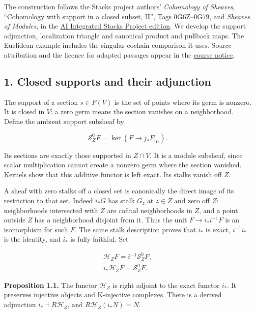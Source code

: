 \documentclass[
  english,
  11pt,
  a4paper,
]{article}
\begin{document}
The construction follows the Stacks project authors' \emph{Cohomology of
Sheaves}, ``Cohomology with support in a closed subset, II'', Tags
0G6Z--0G79, and \emph{Sheaves of Modules}, in the
\href{https://github.com/KokunoYumeto/unofficial-stacks-project-ai-drafts/tree/565b10e987aba5969b21145a0833f42d69f96790}{AI
Integrated Stacks Project edition}. We develop the support adjunction,
localization triangle and canonical product and pullback maps. The
Euclidean example includes the singular-cochain comparison it uses.
Source attribution and the licence for adapted passages appear in the
\hyperref[sources-and-authorship]{course notice}.

\subsection{1. Closed supports and their
adjunction}\label{sections-with-support-and-the-localization-triangle--1-closed-supports-and-their-adjunction}

The support of a section \(s\in F(V)\) is the set of points where its
germ is nonzero. It is closed in \(V\): a zero germ means the section
vanishes on a neighborhood. Define the ambient support subsheaf by

\[\mathcal S_Z^0F=\ker(F\longrightarrow j_*F|_U).
\tag{1.1}\]

Its sections are exactly those supported in \(Z\cap V\). It is a module
subsheaf, since scalar multiplication cannot create a nonzero germ where
the section vanished. Kernels show that this additive functor is left
exact. Its stalks vanish off \(Z\).

A sheaf with zero stalks off a closed set is canonically the direct
image of its restriction to that set. Indeed \(i_*G\) has stalk \(G_z\)
at \(z\in Z\) and zero off \(Z\): neighborhoods intersected with \(Z\)
are cofinal neighborhoods in \(Z\), and a point outside \(Z\) has a
neighborhood disjoint from it. Thus the unit \(F\to i_*i^{-1}F\) is an
isomorphism for such \(F\). The same stalk description proves that
\(i_*\) is exact, \(i^{-1}i_*\) is the identity, and \(i_*\) is fully
faithful. Set

\[\begin{gathered}
\mathcal H_ZF=i^{-1}\mathcal S_Z^0F,\\
i_*\mathcal H_ZF=\mathcal S_Z^0F.
\end{gathered}
\tag{1.2}\]

\textbf{Proposition 1.1.} The functor \(\mathcal H_Z\) is right adjoint
to the exact functor \(i_*\). It preserves injective objects and
K-injective complexes. There is a derived adjunction
\(i_*\dashv R\mathcal H_Z\), and \(R\mathcal H_Z(i_*N)=N\).
\end{document}
